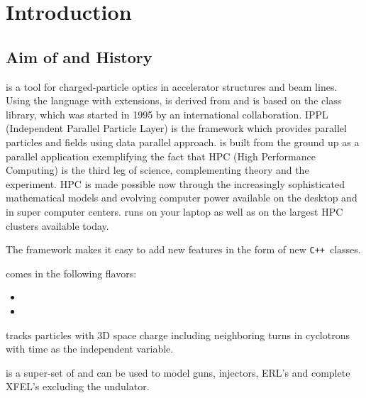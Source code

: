 

\setcounter{page}{1}

\chapter{Introduction}\label{chp:Introduction}

\section{Aim of \opal and History}
\opal is a tool for charged-particle optics in
accelerator structures and beam lines.
Using the \mad language with extensions, \opal is derived from \madninep and is based
on the \classic \cite{bib:classic} class library, which was started in 1995 by an international
collaboration.  IPPL (Independent Parallel Particle Layer) is
the framework which provides parallel particles and fields using data parallel approach.
\opal is built from the ground up as a parallel application exemplifying the fact that HPC (High Performance Computing)
is the third leg of science, complementing theory and the experiment.
HPC is made possible now through the increasingly sophisticated mathematical models and evolving computer power available on the desktop
and in super computer centers. \opal runs on your laptop as well as on the largest HPC clusters available today.

The \opal framework makes it easy to add new features in the form of new
\texttt{C++}~classes.

\opal comes in the following flavors:
\begin{itemize}
\item \opalcycl
\item \opalt
{}
\end{itemize}


\opalcycl tracks particles with 3D space charge including neighboring turns in cyclotrons
with time as the independent variable.

\opalt is a super-set of \impactt \cite{qiang2005} and can be used to model guns, injectors, ERL's and complete XFEL's excluding the undulator.

